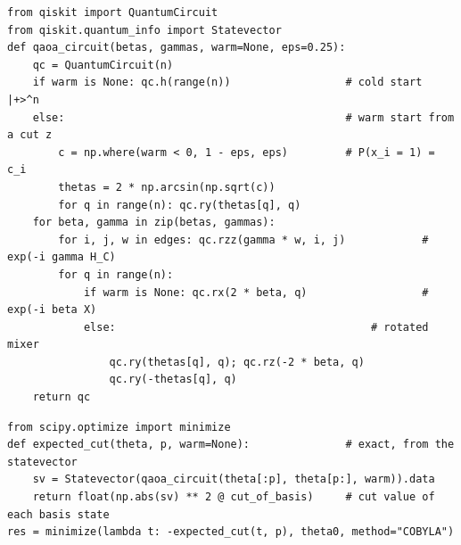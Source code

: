 \documentclass[overheadsbeamer.tex]{subfiles}
\begin{document}
\begin{frame}[fragile]
\begin{lstlisting}
from qiskit import QuantumCircuit
from qiskit.quantum_info import Statevector
def qaoa_circuit(betas, gammas, warm=None, eps=0.25):
    qc = QuantumCircuit(n)
    if warm is None: qc.h(range(n))                  # cold start |+>^n
    else:                                            # warm start from a cut z
        c = np.where(warm < 0, 1 - eps, eps)         # P(x_i = 1) = c_i
        thetas = 2 * np.arcsin(np.sqrt(c))
        for q in range(n): qc.ry(thetas[q], q)
    for beta, gamma in zip(betas, gammas):
        for i, j, w in edges: qc.rzz(gamma * w, i, j)            # exp(-i gamma H_C)
        for q in range(n):
            if warm is None: qc.rx(2 * beta, q)                  # exp(-i beta X)
            else:                                        # rotated mixer
                qc.ry(thetas[q], q); qc.rz(-2 * beta, q)
                qc.ry(-thetas[q], q)
    return qc
\end{lstlisting}
\end{frame}

\begin{frame}[fragile]
\begin{lstlisting}
from scipy.optimize import minimize
def expected_cut(theta, p, warm=None):               # exact, from the statevector
    sv = Statevector(qaoa_circuit(theta[:p], theta[p:], warm)).data
    return float(np.abs(sv) ** 2 @ cut_of_basis)     # cut value of each basis state
res = minimize(lambda t: -expected_cut(t, p), theta0, method="COBYLA")
\end{lstlisting}
\end{frame}
\end{document}
